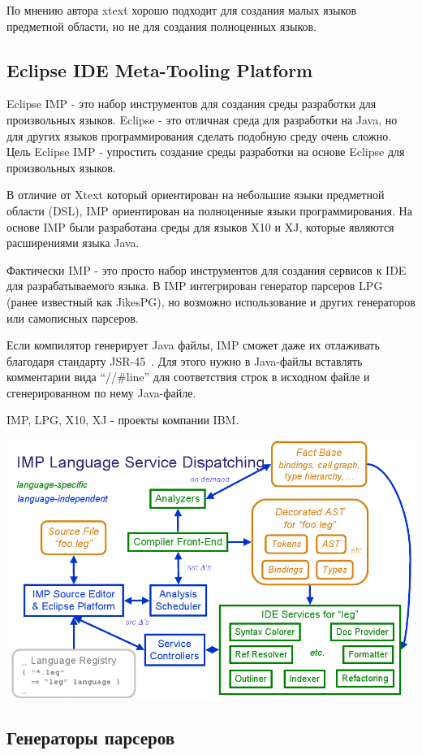 \documentclass[a4paper,12pt]{article}
\begin{document}
По мнению автора xtext хорошо подходит для создания малых языков предметной
области, но не для создания полноценных языков. 

\subsection{Eclipse IDE Meta-Tooling Platform}
Eclipse IMP - это набор инструментов для создания среды разработки для
произвольных языков.
Eclipse - это отличная среда для разработки на Java, но для
других языков программирования сделать подобную среду очень сложно. Цель
Eclipse IMP - упростить создание среды разработки на основе Eclipse для
произвольных языков.

В отличие от Xtext который ориентирован на небольшие языки предметной области
(DSL), IMP ориентирован на полноценные языки программирования. На основе IMP
были разработана среды для языков X10 и XJ, которые являются расширениями
языка Java.

Фактически IMP - это просто набор инструментов для создания сервисов к IDE для
разрабатываемого языка. В IMP интегрирован генератор парсеров LPG (ранее
известный как JikesPG), но возможно использование и других генераторов или
самописных парсеров.

Если компилятор генерирует Java файлы, IMP сможет даже их отлаживать благодаря
стандарту JSR-45~\cite{JSR45}. Для этого нужно в Java-файлы вставлять
комментарии вида ``//\#line'' для соответствия строк в исходном файле и сгенерированном по нему Java-файле.

IMP, LPG, X10, XJ - проекты компании IBM.

\includegraphics[scale=0.4]{img/imp.png}

\subsection{Генераторы парсеров}
\end{document}
